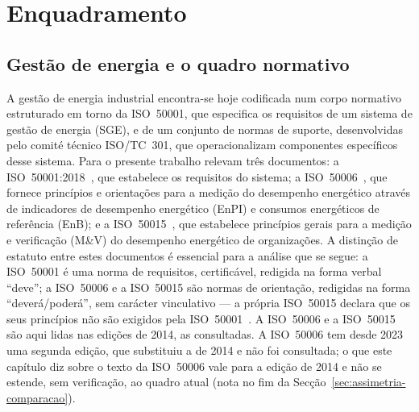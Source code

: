 
\chapter{Enquadramento}
\label{cha:enquadramento}

\section{Gestão de energia e o quadro normativo}
\label{sec:normas}

A gestão de energia industrial encontra-se hoje codificada num corpo normativo estruturado em torno da ISO~50001, que especifica os requisitos de um sistema de gestão de energia (SGE), e de um conjunto de normas de suporte, desenvolvidas pelo comité técnico ISO/TC~301, que operacionalizam componentes específicos desse sistema. Para o presente trabalho relevam três documentos: a ISO~50001:2018~\cite{ISO50001_2018}, que estabelece os requisitos do sistema; a ISO~50006~\cite{ISO50006_2014}, que fornece princípios e orientações para a medição do desempenho energético através de indicadores de desempenho energético (EnPI) e consumos energéticos de referência (EnB); e a ISO~50015~\cite{ISO50015_2014}, que estabelece princípios gerais para a medição e verificação (M\&V) do desempenho energético de organizações. A distinção de estatuto entre estes documentos é essencial para a análise que se segue: a ISO~50001 é uma norma de requisitos, certificável, redigida na forma verbal \enquote{deve}; a ISO~50006 e a ISO~50015 são normas de orientação, redigidas na forma \enquote{deverá/poderá}, sem carácter vinculativo --- a própria ISO~50015 declara que os seus princípios não são exigidos pela ISO~50001~\cite[Introdução]{ISO50015_2014}. A ISO~50006 e a ISO~50015 são aqui lidas nas edições de 2014, as consultadas. A ISO~50006 tem desde 2023 uma segunda edição, que substituiu a de 2014 e não foi consultada; o que este capítulo diz sobre o texto da ISO~50006 vale para a edição de 2014 e não se estende, sem verificação, ao quadro atual (nota no fim da Secção~\ref{sec:assimetria-comparacao}).

